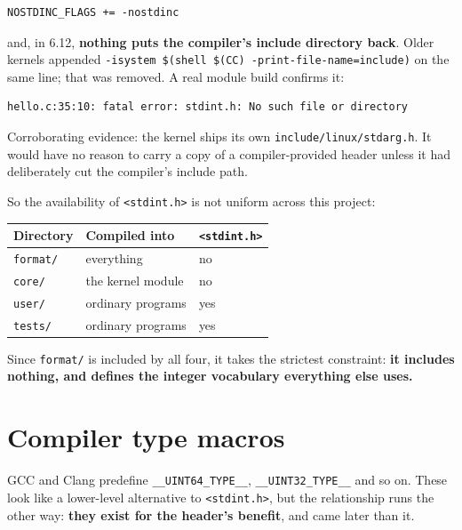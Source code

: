 \begin{lstlisting}[style=shell]
NOSTDINC_FLAGS += -nostdinc
\end{lstlisting}

and, in 6.12, \textbf{nothing puts the compiler's include directory back}.
Older kernels appended
\lstinline|-isystem $(shell $(CC) -print-file-name=include)| on the same line;
that was removed. A real module build confirms it:

\begin{lstlisting}[style=shell]
hello.c:35:10: fatal error: stdint.h: No such file or directory
\end{lstlisting}

Corroborating evidence: the kernel ships its own
\lstinline|include/linux/stdarg.h|. It would have no reason to carry a copy of
a compiler-provided header unless it had deliberately cut the compiler's
include path.

So the availability of \lstinline|<stdint.h>| is not uniform across this
project:

\begin{center}
\begin{tabular}{lll}
  \toprule
  Directory & Compiled into & \lstinline|<stdint.h>| \\
  \midrule
  \lstinline|format/| & everything          & no \\
  \lstinline|core/|   & the kernel module   & no \\
  \lstinline|user/|   & ordinary programs   & yes \\
  \lstinline|tests/|  & ordinary programs   & yes \\
  \bottomrule
\end{tabular}
\end{center}

Since \lstinline|format/| is included by all four, it takes the strictest
constraint: \textbf{it includes nothing, and defines the integer vocabulary
everything else uses.}

\section{Compiler type macros}
\label{sec:type-macros}

GCC and Clang predefine \lstinline|__UINT64_TYPE__|, \lstinline|__UINT32_TYPE__|
and so on. These look like a lower-level alternative to \lstinline|<stdint.h>|,
but the relationship runs the other way: \textbf{they exist for the header's
benefit}, and came later than it.

